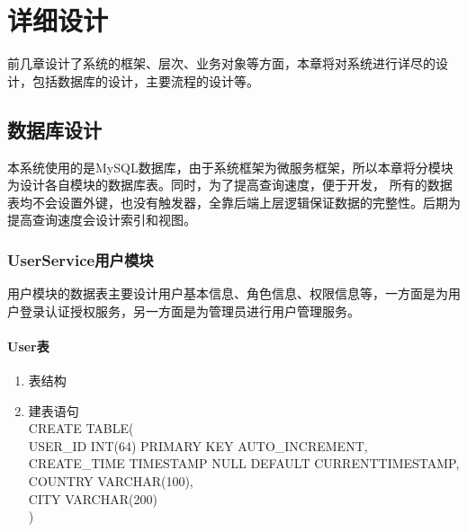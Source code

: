 \chapter{详细设计}
前几章设计了系统的框架、层次、业务对象等方面，本章将对系统进行详尽的设计，包括数据库的设计，主要流程的设计等。
\section{数据库设计}
本系统使用的是MySQL数据库，由于系统框架为微服务框架，所以本章将分模块为设计各自模块的数据库表。同时，为了提高查询速度，便于开发，
所有的数据表均不会设置外键，也没有触发器，全靠后端上层逻辑保证数据的完整性。后期为提高查询速度会设计索引和视图。
\subsection{UserService用户模块}
用户模块的数据表主要设计用户基本信息、角色信息、权限信息等，一方面是为用户登录认证授权服务，另一方面是为管理员进行用户管理服务。
\subsubsection{User表}
\begin{enumerate}
    \item 表结构
    \begin{table}[htbp]
        \centering
        \end{table}
    \item 建表语句\\
        CREATE TABLE(\\
            USER\_ID INT(64) PRIMARY KEY AUTO\_INCREMENT,\\
            CREATE\_TIME TIMESTAMP NULL DEFAULT CURRENTTIMESTAMP,\\
            COUNTRY VARCHAR(100),\\
            CITY VARCHAR(200)\\
        )
    \end{enumerate}

